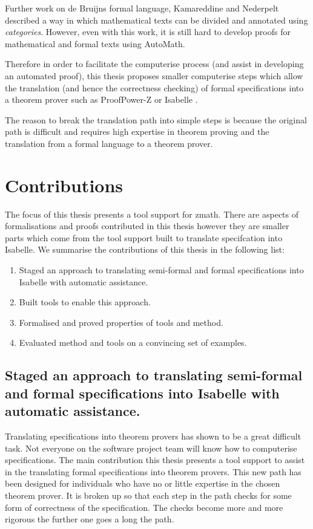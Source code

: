 Further work on de Bruijns formal language, Kamareddine and Nederpelt \cite{wtt} described a way in which mathematical texts can be divided and annotated using \emph{categories}. However, even with this work, it is still hard to develop proofs for mathematical and formal texts using AutoMath.

Therefore in order to facilitate the \gls{computerise} process (and assist in developing an automated proof), this thesis proposes smaller \gls{computerise} steps which allow the translation (and hence the correctness checking) of formal specifications into a theorem prover such as ProofPower-Z \cite{pp} or Isabelle \cite{isabelle}. 

The reason to break the translation path into simple steps is because the original path is difficult and requires high expertise in theorem proving and the translation from a formal language to a theorem prover.

\section{Contributions}

The focus of this thesis presents a tool support for \gls{zmath}. There are aspects of formalisations and proofs contributed in this thesis however they are smaller parts which come from the tool support built to translate specifcation into Isabelle. We summarise the contributions of this thesis in the following list:

\begin{enumerate}
\item Staged an approach to translating semi-formal and formal specifications into Isabelle with automatic assistance.
\item Built tools to enable this approach.
\item Formalised and proved properties of tools and method.
\item Evaluated method and tools on a convincing set of examples.
\end{enumerate}

\subsection{Staged an approach to translating semi-formal and formal specifications into Isabelle with automatic assistance.}

Translating specifications into theorem provers has shown to be a great difficult task. Not everyone on the software project team will know how to computerise specifications. The main contribution this thesis presents a tool support to assist in the translating formal specifications into theorem provers. This new path has been designed for individuals who have no or little expertise in the chosen theorem prover. It is broken up so that each step in the path checks for some form of correctness of the specification. The checks become more and more rigorous the further one goes a long the path.

